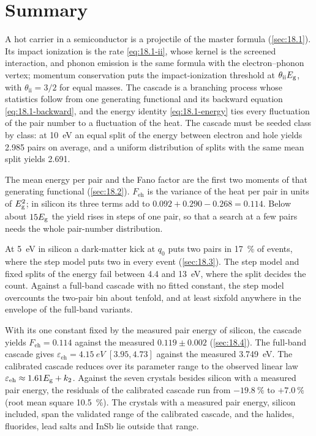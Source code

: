 \section*{Summary}

A hot carrier in a semiconductor is a projectile of the master formula (\cref{sec:18.1}). Its impact ionization is the rate \cref{eq:18.1-ii}, whose kernel is the screened interaction, and phonon emission is the same formula with the electron--phonon vertex; momentum conservation puts the impact-ionization threshold at $\theta_{\mathrm{ii}}E_{\mathrm{g}}$, with $\theta_{\mathrm{ii}} = 3/2$ for equal masses. The cascade is a branching process whose statistics follow from one generating functional and its backward equation \cref{eq:18.1-backward}, and the energy identity \cref{eq:18.1-energy} ties every fluctuation of the pair number to a fluctuation of the heat. The cascade must be seeded class by class: at \SI{10}{eV} an equal split of the energy between electron and hole yields 2.985 pairs on average, and a uniform distribution of splits with the same mean split yields 2.691.

The mean energy per pair and the Fano factor are the first two moments of that generating functional (\cref{sec:18.2}). $F_{\mathrm{eh}}$ is the variance of the heat per pair in units of $E_{\mathrm{g}}^2$; in silicon its three terms add to $0.092 + 0.290 - 0.268 = 0.114$. Below about $15E_{\mathrm{g}}$ the yield rises in steps of one pair, so that a search at a few pairs needs the whole pair-number distribution.

At \SI{5}{eV} in silicon a dark-matter kick at $q_0$ puts two pairs in \SI{17}{\percent} of events, where the step model puts two in every event (\cref{sec:18.3}). The step model and fixed splits of the energy fail between 4.4 and \SI{13}{eV}, where the split decides the count. Against a full-band cascade with no fitted constant, the step model overcounts the two-pair bin about tenfold, and at least sixfold anywhere in the envelope of the full-band variants.

With its one constant fixed by the measured pair energy of silicon, the cascade yields $F_{\mathrm{eh}} = 0.114$ against the measured $0.119 \pm 0.002$ (\cref{sec:18.4}). The full-band cascade gives $\varepsilon_{\mathrm{eh}} = \SI{4.15}{eV}$ $[3.95, 4.73]$ against the measured \SI{3.749}{eV}. The calibrated cascade reduces over its parameter range to the observed linear law $\varepsilon_{\mathrm{eh}} \approx 1.61E_{\mathrm{g}} + k_2$. Against the seven crystals besides silicon with a measured pair energy, the residuals of the calibrated cascade run from $-\SI{19.8}{\percent}$ to $+\SI{7.0}{\percent}$ (root mean square \SI{10.5}{\percent}). The crystals with a measured pair energy, silicon included, span the validated range of the calibrated cascade, and the halides, fluorides, lead salts and InSb lie outside that range.

